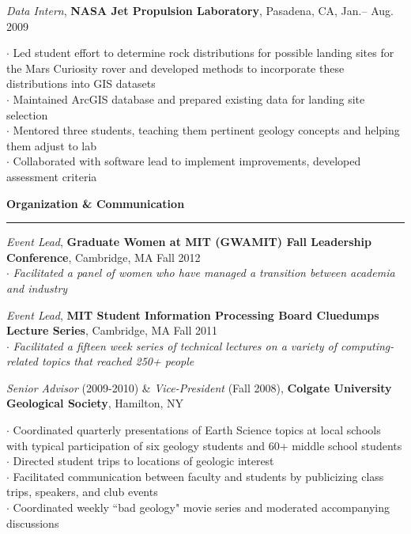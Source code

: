 \documentclass[10pt]{article}
\begin{document}
\smallskip
\emph{Data Intern}, \textbf{NASA Jet Propulsion Laboratory}, Pasadena, CA, Jan.-- Aug. 2009 \\
\begin{small}$\cdot$ {Led student effort to determine rock distributions for possible landing sites for the Mars Curiosity rover and developed methods to incorporate these distributions into GIS datasets }\\ 
$\cdot$ {Maintained ArcGIS  database and prepared existing data for landing site selection } \\
$\cdot$ {Mentored three students, teaching them pertinent geology concepts and helping them adjust to lab }\\
$\cdot$ {Collaborated with software lead to implement improvements, developed assessment criteria}\end{small} 

\begin{comment}
\smallskip
\textbf{Research Student}, \emph{Colgate University Geology Laboratories}, Hamilton, NY, Feb.--May 2008 \\
\begin{small}$\cdot$ {Used remote sensing software to create a data system from the digital data of existing satellite images, weather, and climate data }\end{small}
\smallskip
\end{comment}

\vspace*{0.25 mm}
\textbf{Organization \& Communication}
\smallskip
\hrule
\emph{Event Lead}, \textbf{Graduate Women at MIT (GWAMIT) Fall Leadership Conference}, Cambridge, MA Fall 2012\\
$\cdot$ \emph{Facilitated a panel of women who have managed a transition between academia and industry}

\emph{Event Lead}, \textbf{MIT Student Information Processing Board Cluedumps Lecture Series}, Cambridge, MA Fall 2011\\
$\cdot$ \emph{Facilitated a fifteen week series of technical lectures on a variety of computing-related topics that reached 250+ people}

\emph{Senior Advisor} (2009-2010) \& \emph{Vice-President} (Fall 2008), \textbf{Colgate University Geological Society}, Hamilton, NY \\
\begin{small}$\cdot$ {Coordinated quarterly presentations of Earth Science topics at local schools with typical participation of six geology students and 60+ \hspace*{1 mm} middle school students} \\
$\cdot$ {Directed student trips to locations of geologic interest } \\
$\cdot$ {Facilitated communication between faculty and students by publicizing class trips, speakers, and club events } \\
$\cdot$ {Coordinated weekly ``bad geology" movie series and moderated accompanying discussions}\end{small}
\end{document}
